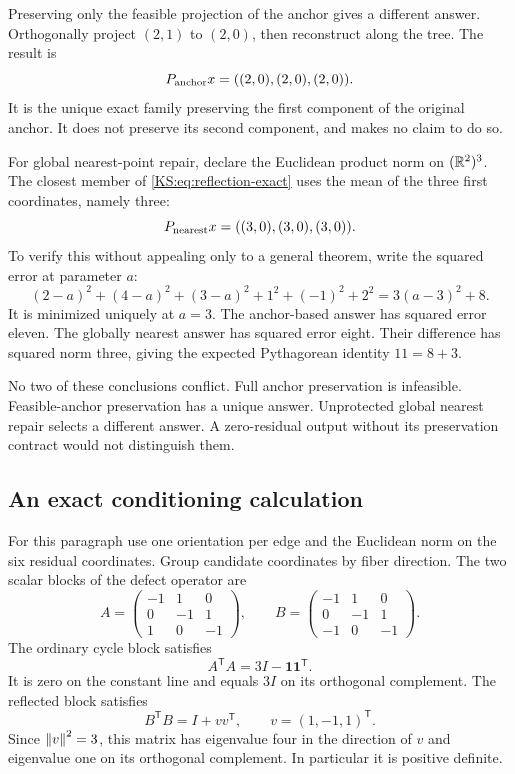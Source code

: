 Preserving only the feasible projection of the anchor gives a different answer. Orthogonally project \((2,1)\) to \((2,0)\), then reconstruct along the tree. The result is
\[
 P_{\rm anchor}x=((2,0),(2,0),(2,0)).
\]
It is the unique exact family preserving the first component of the original anchor. It does not preserve its second component, and makes no claim to do so.

For global nearest-point repair, declare the Euclidean product norm on \((\mathbb R^2)^3\). The closest member of \eqref{KS:eq:reflection-exact} uses the mean of the three first coordinates, namely three:
\[
 P_{\rm nearest}x=((3,0),(3,0),(3,0)).
\]
To verify this without appealing only to a general theorem, write the squared error at parameter \(a\):
\[
 (2-a)^2+(4-a)^2+(3-a)^2+1^2+(-1)^2+2^2
 =3(a-3)^2+8.
\]
It is minimized uniquely at \(a=3\). The anchor-based answer has squared error eleven. The globally nearest answer has squared error eight. Their difference has squared norm three, giving the expected Pythagorean identity \(11=8+3\).

No two of these conclusions conflict. Full anchor preservation is infeasible. Feasible-anchor preservation has a unique answer. Unprotected global nearest repair selects a different answer. A zero-residual output without its preservation contract would not distinguish them.

\subsection{An exact conditioning calculation}
For this paragraph use one orientation per edge and the Euclidean norm on the six residual coordinates. Group candidate coordinates by fiber direction. The two scalar blocks of the defect operator are
\[
 A=\begin{pmatrix}-1&1&0\\0&-1&1\\1&0&-1\end{pmatrix},\qquad
 B=\begin{pmatrix}-1&1&0\\0&-1&1\\-1&0&-1\end{pmatrix}.
\]
The ordinary cycle block satisfies
\[
 A^{\mathsf T}A=3I-\mathbf1\mathbf1^{\mathsf T}.
\]
It is zero on the constant line and equals \(3I\) on its orthogonal complement. The reflected block satisfies
\[
 B^{\mathsf T}B=I+vv^{\mathsf T},\qquad v=(1,-1,1)^{\mathsf T}.
\]
Since \(\left\lVert v\right\rVert^2=3\), this matrix has eigenvalue four in the direction of \(v\) and eigenvalue one on its orthogonal complement. In particular it is positive definite.

